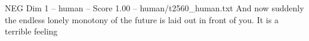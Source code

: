 \begin{textsample}{NEG Dim 1 – human – Score 1.00 – human/t2560\_human.txt}  \label{ex:f1_neg_017}
And now suddenly the endless lonely monotony of the future is laid out in front of you.
It is a terrible feeling

\end{textsample}
